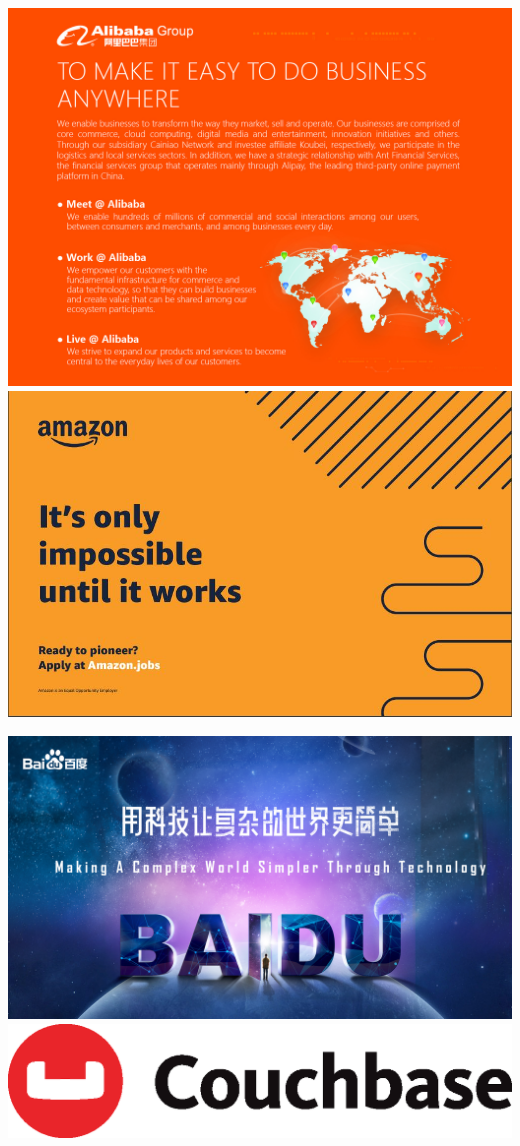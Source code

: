 \includegraphics[height=.49\textheight,width=\textwidth,keepaspectratio]{ads/alibaba.jpg}
\vfill
\includegraphics[height=.49\textheight,width=\textwidth,keepaspectratio]{ads/amazon.jpg}
\pagebreak

\includegraphics[height=.49\textheight,width=\textwidth,keepaspectratio]{ads/baidu.jpg}
\vfill
\includegraphics[height=.49\textheight,width=\textwidth,keepaspectratio]{ads/couchbase.eps}
\pagebreak

